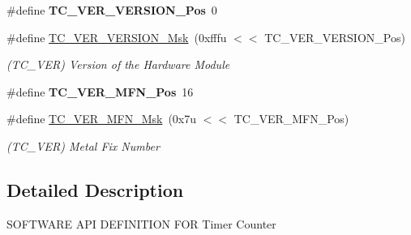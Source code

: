 \begin{DoxyCompactItemize}
\mbox{\label{group__SAMV71__TC_ga235ac00be6f92d242129c2129faacc0d}} 
\#define {\bfseries T\+C\+\_\+\+V\+E\+R\+\_\+\+V\+E\+R\+S\+I\+O\+N\+\_\+\+Pos}~0
\item 
\mbox{\label{group__SAMV71__TC_ga64c54c9b6181f667e33045eac6eb1ab0}} 
\#define \mbox{\hyperlink{group__SAMV71__TC_ga64c54c9b6181f667e33045eac6eb1ab0}{T\+C\+\_\+\+V\+E\+R\+\_\+\+V\+E\+R\+S\+I\+O\+N\+\_\+\+Msk}}~(0xfffu $<$$<$ T\+C\+\_\+\+V\+E\+R\+\_\+\+V\+E\+R\+S\+I\+O\+N\+\_\+\+Pos)
\begin{DoxyCompactList}\small\item\em (T\+C\+\_\+\+V\+ER) Version of the Hardware Module \end{DoxyCompactList}\item 
\mbox{\label{group__SAMV71__TC_gad33f817707956a3b44eed063d39c5f89}} 
\#define {\bfseries T\+C\+\_\+\+V\+E\+R\+\_\+\+M\+F\+N\+\_\+\+Pos}~16
\item 
\mbox{\label{group__SAMV71__TC_ga7db90681d8a8a99d47b336d96e4f7f9d}} 
\#define \mbox{\hyperlink{group__SAMV71__TC_ga7db90681d8a8a99d47b336d96e4f7f9d}{T\+C\+\_\+\+V\+E\+R\+\_\+\+M\+F\+N\+\_\+\+Msk}}~(0x7u $<$$<$ T\+C\+\_\+\+V\+E\+R\+\_\+\+M\+F\+N\+\_\+\+Pos)
\begin{DoxyCompactList}\small\item\em (T\+C\+\_\+\+V\+ER) Metal Fix Number \end{DoxyCompactList}\end{DoxyCompactItemize}


\subsection{Detailed Description}
S\+O\+F\+T\+W\+A\+RE A\+PI D\+E\+F\+I\+N\+I\+T\+I\+ON F\+OR Timer Counter 